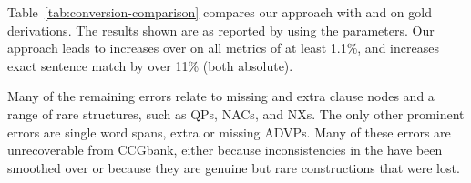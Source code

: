Table~\ref{tab:conversion-comparison} compares our approach with \old and \textcite{zhang-zhao-hui:2012:DEMOS} on gold \ccg derivations.
The results shown are as reported by \evalb \parencite{Black-etal:1991} using the \textcite{Collins:1997} parameters.
Our approach leads to increases over \old on all metrics of at least 1.1\%, and increases exact sentence match by over 11\% (both absolute).

Many of the remaining errors relate to missing and extra clause nodes and a range of rare structures, such as QPs, NACs, and NXs.
The only other prominent errors are single word spans, \myeg extra or missing ADVPs.
Many of these errors are unrecoverable from CCGbank, either because inconsistencies in the \ptb have been smoothed over or because they are genuine but rare constructions that were lost.

